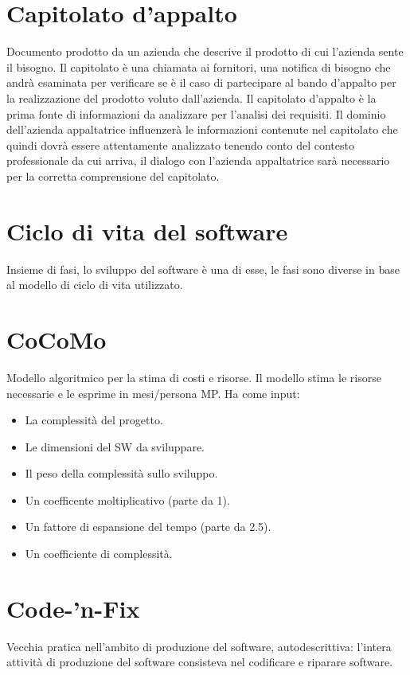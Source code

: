 \documentclass[11pt]{article}
\begin{document}
	\section{\LARGE Capitolato d'appalto}
	\label{sec:capitolato}
	Documento prodotto da un azienda che descrive il prodotto di cui l'azienda sente il bisogno. Il capitolato è una chiamata ai fornitori, una notifica di bisogno che andrà esaminata per verificare se è il caso di partecipare al bando d'appalto per la realizzazione del prodotto voluto dall'azienda. Il capitolato d'appalto è la prima fonte di informazioni da analizzare per l'analisi dei requisiti. Il dominio dell'azienda appaltatrice influenzerà le informazioni contenute nel capitolato che quindi dovrà essere attentamente analizzato tenendo conto del contesto professionale da cui arriva, il dialogo con l'azienda appaltatrice sarà necessario per la corretta comprensione del capitolato. 
	
	\section{\LARGE Ciclo di vita del software}
	\label{sec:ciclodivita}
	Insieme di fasi, lo sviluppo del software è una di esse, le fasi sono diverse in base al modello di ciclo di vita utilizzato.

	\section{\LARGE CoCoMo}
	\label{sec:cocomo}
	Modello algoritmico per la stima di costi e risorse. Il modello stima le risorse necessarie e le esprime in mesi/persona MP. Ha come input:
	\begin{itemize}  
	\item La complessità del progetto.
	\item Le dimensioni del SW da sviluppare.
	\item Il peso della complessità sullo sviluppo.
	\item Un coefficente moltiplicativo (parte da 1).
	\item Un fattore di espansione del tempo (parte da 2.5).
	\item Un coefficiente di complessità. 
	\end{itemize}		

	\section{\LARGE Code-'n-Fix}
	\label{sec:codenfix}
	Vecchia pratica nell'ambito di produzione del software, autodescrittiva: l'intera attività di produzione del software consisteva nel codificare e riparare software.
	
\end{document}
